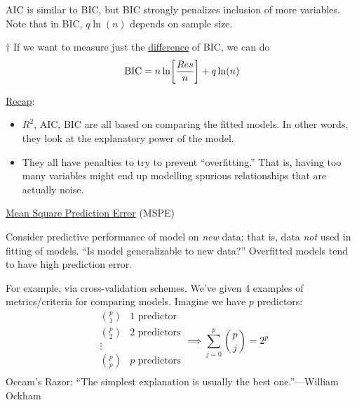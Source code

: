 \begin{Remark}{}{}
    AIC is similar to BIC, but BIC strongly penalizes
    inclusion of more variables. Note that in BIC,
    $ q\ln(n) $ depends on sample size.
\end{Remark}
\begin{Remark}{$ \dagger $}{}
    If we want to measure
    just the \underline{difference} of BIC, we can do
    \[ \text{BIC}=n\ln\biggl[ \frac{\relax{Res}}{n} \biggr]+q\ln(n) \]
\end{Remark}
\underline{Recap}:
\begin{itemize}
    \item $ R^2 $, AIC, BIC
          are all based on comparing the fitted models.
          In other words, they look at the explanatory power of
          the model.
    \item They all have penalties to try to prevent
          ``overfitting.'' That is, having too many
          variables might end up modelling
          spurious relationships that are actually
          noise.
\end{itemize}

\underline{Mean Square Prediction Error} (MSPE)

Consider predictive performance of model on \emph{new}
data; that is, data \emph{not} used in fitting
of models. ``Is model generalizable to new data?''
Overfitted models tend to have high prediction error.

For example, via cross-validation schemes.
We've given 4 examples of metrics/criteria for comparing
models. Imagine we have $ p $ predictors:
\[ \begin{matrix}
        \binom{p}{1} & 1 \text{ predictor}  \\
        \binom{p}{2} & 2 \text{ predictors} \\
        \vdots                              \\
        \binom{p}{p} & p \text{ predictors} \\
    \end{matrix}
    \implies
    \sum_{j=0}^{p}\binom{p}{j}=2^p
\]
Occam's Razor: ``The simplest explanation is
usually the best one.''---William Ockham
